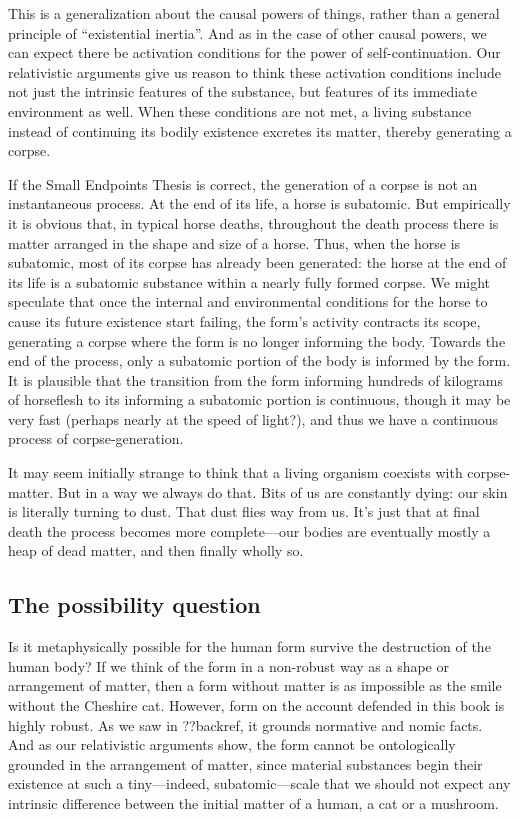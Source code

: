 This is a generalization about the causal powers of things, rather than a general principle of ``existential inertia''.
And as in the case of other causal powers, we can expect there be activation conditions for the power of self-continuation.
Our relativistic arguments give us reason to think these activation conditions include not just the intrinsic features 
of the substance, but features of its immediate environment as well. When these conditions are not met, a living 
substance instead of continuing its bodily existence excretes its matter, thereby generating a corpse. 

If the Small Endpoints Thesis is correct, the generation of a corpse is not an instantaneous process. At the end of its 
life, a horse is subatomic. But empirically it is obvious that, in typical horse deaths, throughout the death process there 
is matter arranged in the shape and size of a horse. Thus, when the horse is subatomic, most of its corpse has already been
generated: the horse at the end of its life is a subatomic substance within a nearly fully formed corpse. We might speculate
that once the internal and environmental conditions for the horse to cause its future existence start failing, the form's 
activity contracts its scope, generating a corpse where the form is no longer informing the body. Towards the end
of the process, only a subatomic portion of the body is informed by the form. It is plausible that the transition from 
the form informing hundreds of kilograms of horseflesh to its informing a subatomic portion is continuous, though it may be 
very fast (perhaps nearly at the speed of light?), and thus we have a continuous process of corpse-generation. 

It may seem initially strange to think that a living organism coexists with corpse-matter. But in a way we always do 
that. Bits of us are constantly dying: our skin is literally turning to dust. That dust flies way from us. It's just
that at final death the process becomes more complete---our bodies are eventually mostly a heap of dead matter, and then
finally wholly so. 

\subsection{The possibility question}
Is it metaphysically possible for the human form survive the destruction of the human body? If we think of the form in a non-robust way as 
a shape or arrangement of matter, then a form without matter is as 
impossible as the smile without the Cheshire cat. However, form on the account defended in this book is highly robust. 
As we saw in ??backref, it grounds normative and nomic facts. And as our relativistic arguments show, the form cannot
be ontologically grounded in the arrangement of matter, since material substances begin their existence at such a tiny---indeed, subatomic---scale  that we should not expect any intrinsic difference between the initial matter of a human, a cat or a mushroom.


